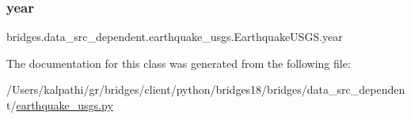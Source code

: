 \subsubsection{\texorpdfstring{year}{year}}
{\footnotesize\ttfamily bridges.\+data\+\_\+src\+\_\+dependent.\+earthquake\+\_\+usgs.\+Earthquake\+U\+S\+G\+S.\+year}



The documentation for this class was generated from the following file\+:\begin{DoxyCompactItemize}
\item 
/\+Users/kalpathi/gr/bridges/client/python/bridges18/bridges/data\+\_\+src\+\_\+dependent/\mbox{\hyperlink{earthquake__usgs_8py}{earthquake\+\_\+usgs.\+py}}\end{DoxyCompactItemize}

